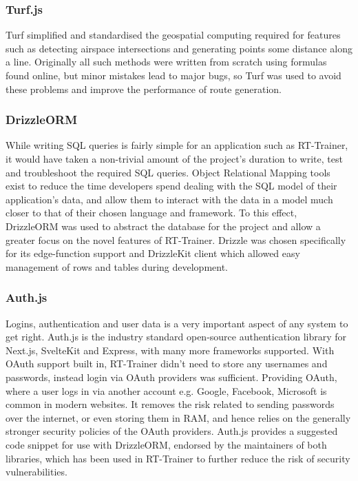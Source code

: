 \subsubsection{Turf.js}
\label{ssse:turfjs}
Turf simplified and standardised the geospatial computing required for features such as detecting airspace intersections and generating points some distance along a line. Originally all such methods were written from scratch using formulas found online, but minor mistakes lead to major bugs, so Turf was used to avoid these problems and improve the performance of route generation.

\subsubsection{DrizzleORM}
\label{ssse:drizzle}
While writing SQL queries is fairly simple for an application such as RT-Trainer, it would have taken a non-trivial amount of the project's duration to write, test and troubleshoot the required SQL queries. Object Relational Mapping tools exist to reduce the time developers spend dealing with the SQL model of their application's data, and allow them to interact with the data in a model much closer to that of their chosen language and framework. To this effect, DrizzleORM was used to abstract the database for the project and allow a greater focus on the novel features of RT-Trainer. Drizzle was chosen specifically for its edge-function support and DrizzleKit client which allowed easy management of rows and tables during development.

\subsubsection{Auth.js}
\label{ssse:authjs}
Logins, authentication and user data is a very important aspect of any system to get right. Auth.js is the industry standard open-source authentication library for Next.js, SvelteKit and Express, with many more frameworks supported. With OAuth support built in, RT-Trainer didn't need to store any usernames and passwords, instead login via OAuth providers was sufficient. Providing OAuth, where a user logs in via another account e.g. Google, Facebook, Microsoft is common in modern websites. It removes the risk related to sending passwords over the internet, or even storing them in RAM, and hence relies on the generally stronger security policies of the OAuth providers. Auth.js provides a suggested code snippet for use with DrizzleORM, endorsed by the maintainers of both libraries, which has been used in RT-Trainer to further reduce the risk of security vulnerabilities.

